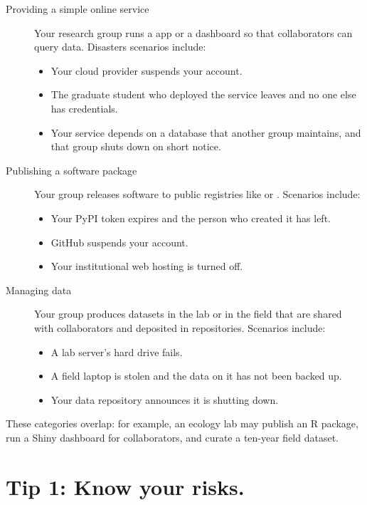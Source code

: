 \documentclass[10pt,letterpaper]{article}
\begin{document}
\begin{description}
  
\item[Providing a simple online service]
  Your research group runs a  app
  or a  dashboard so that collaborators can query data.
  Disasters scenarios include:
  \begin{itemize}
  \item Your cloud provider suspends your account.
  \item The graduate student who deployed the service leaves and no one else has credentials.
  \item Your service depends on a database that another group maintains,
    and that group shuts down on short notice.
  \end{itemize}
  
\item[Publishing a software package]
  Your group releases software to public registries like  or
  . Scenarios include:
  \begin{itemize}
  \item Your PyPI token expires and the person who created it has left.
  \item GitHub suspends your account.
  \item Your institutional web hosting is turned off.
  \end{itemize}
  
\item[Managing data]
  Your group produces datasets in the lab or in the field that are shared with
  collaborators and deposited in repositories.  Scenarios include:
  \begin{itemize}
  \item A lab server's hard drive fails.
  \item A field laptop is stolen and the data on it has not been backed up.
  \item Your data repository announces it is shutting down.
  \end{itemize}
  
\end{description}

These categories overlap: for example, an ecology lab may publish an R package,
run a Shiny dashboard for collaborators, and curate a ten-year field dataset.

\section*{Tip 1: Know your risks.}
\end{document}
